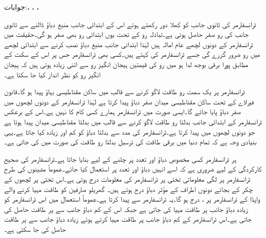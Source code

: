 جوابات:، ، ، 

ٹرانسفارمر کی ثانوی جانب کو کھلا دور رکھتے ہوئے اس کے ابتدائی جانب منبع دباؤ ڈالنے  سے ثانوی جانب کی رو صفر حاصل ہوتی ہے۔تبادلہ رو کے تحت یوں ابتدائی رو بھی صفر ہو گی۔حقیقت میں ٹرانسفارمر کے دونوں لچھے عام امالہ ہیں لہٰذا ابتدائی جانب منبع دباؤ نصب کرنے سے ابتدائی لچھے میں رو ضرور گزرے گی جسے ٹرانسفارمر کی  کہتے ہیں۔کسی بھی ٹرانسفارمر جس پر اس کے سکت کے مطابق پورا برقی بوجھ لدا ہو میں رو کی قیمتیں  ہیجان انگیز رو سے اتنی زیادہ ہوتی ہیں کہ ہیجان انگیز رو کو نظر انداز کیا جا سکتا ہے۔

ٹرانسفارمر پر یک سمت رو طاقت لاگو کرنے سے قالب میں ساکن مقناطیسی بہاؤ پیدا ہو گا۔قانون فیراڈے کے تحت ساکن مقناطیسی میدان صفر دباؤ پیدا کرتا ہے لہٰذا ٹرانسفارمر کے دونوں لچھوں میں صفر دباؤ پایا جائے گا۔ایسی صورت میں ٹرانسفارمر ہمارے کسی کام کا نہیں ہے۔اس کے برعکس ٹرانسفارمر کے ابتدائی جانب بدلتا رو طاقت لاگو کرنے سے قالب میں بدلتا مقناطیسی میدان پیدا ہوتا ہے جو دونوں لچھوں میں   پیدا کرتا ہے۔ٹرانسفارمر کی مدد سے بدلتا دباؤ کو کم اور زیادہ کیا جاتا ہے۔یہی بنیادی وجہ ہے کہ تمام دنیا میں برقی طاقت کی ترسیل بدلتا رو طاقت کی صورت میں کی جاتی ہے۔

ہر ٹرانسفارمر کسی مخصوص دباؤ اور تعدد پر چلنے کے لیے بنایا جاتا ہے۔ٹرانسفارمر کی صحیح کارکردگی کے لیے ضروری ہے کہ اسے انہیں دباؤ اور تعدد پر استعمال کیا جائے۔عموماً مشینوں کی طرح ٹرانسفارمر پر لگی معلوماتی تختی پر ٹرانسفارمر کی معلومات درج ہوتی ہے۔اس تختی پر لچھوں کے چکر کے بجائے دونوں اطراف کے مؤثر دباؤ درج ہوتے ہیں۔ گھریلو صارفین کو طاقت مہیا کرنے والے واپڈا کے ٹرانسفارمر پر ،  درج ہو گا۔یہ ٹرانسفارمر  سے  پیدا کرتا ہے۔عموماً استعمال میں اس ٹرانسفارمر کو زیادہ دباؤ جانب  پر طاقت مہیا کی جاتی ہے  جبکہ اس کے کم دباؤ جانب سے  پر طاقت حاصل کی جاتی ہے۔اس ٹرانسفارمر کے کم دباؤ جانب  پر طاقت مہیا کرتے ہوئے زیادہ دباؤ جانب سے  پر طاقت حاصل کی جا سکتی ہے۔

